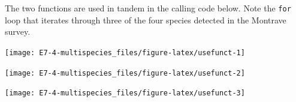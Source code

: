 \documentclass[10pt,a4paper]{tufte-handout}
\newenvironment{Shaded}{\begin{snugshade}}{\end{snugshade}}
\newcommand{\CharTok}[1]{\textcolor[rgb]{0.31,0.60,0.02}{#1}}
\newcommand{\ControlFlowTok}[1]{\textcolor[rgb]{0.13,0.29,0.53}{\textbf{#1}}}
\newcommand{\DataTypeTok}[1]{\textcolor[rgb]{0.13,0.29,0.53}{#1}}
\newcommand{\DecValTok}[1]{\textcolor[rgb]{0.00,0.00,0.81}{#1}}
\newcommand{\KeywordTok}[1]{\textcolor[rgb]{0.13,0.29,0.53}{\textbf{#1}}}
\newcommand{\NormalTok}[1]{#1}
\newcommand{\OperatorTok}[1]{\textcolor[rgb]{0.81,0.36,0.00}{\textbf{#1}}}
\newcommand{\OtherTok}[1]{\textcolor[rgb]{0.56,0.35,0.01}{#1}}
\newcommand{\StringTok}[1]{\textcolor[rgb]{0.31,0.60,0.02}{#1}}
\begin{document}
The two functions are used in tandem in the calling code below. Note the
\texttt{for} loop that iterates through three of the four species
detected in the Montrave survey.

\begin{Shaded}
\end{Shaded}

\begin{marginfigure}
\texttt{[image: E7-4-multispecies\_files/figure-latex/usefunct-1]} \end{marginfigure}
\begin{marginfigure}
\texttt{[image: E7-4-multispecies\_files/figure-latex/usefunct-2]} \end{marginfigure}
\begin{marginfigure}
\texttt{[image: E7-4-multispecies\_files/figure-latex/usefunct-3]} \end{marginfigure}


\end{document}
